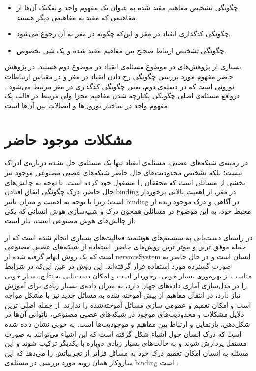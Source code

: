 \documentclass[12pt]{report}
\begin{document}
	\begin{itemize}
		\item چگونگی تشخیص مفاهیم مقید شده به عنوان یک مفهوم واحد  و تفکیک آن‌ها از مفاهیمی که مقید به مفاهیمی دیگر هستند.
		\item چگونگی کد‌گذاری انقیاد در مغز و این‌که چگونه در مغز به آن رجوع می‌شود.
		\item چگونگی تشخیص ارتباط صحیح بین مفاهیم  مقید شده و یک شی بخصوص.
	\end{itemize}

	بسیاری از پژوهش‌های در موضوع مسئله‌ی انقیاد در موضوع دوم هستند. در پژوهش حاضر مفهوم مورد بررسی چگونگی رخ دادن انقیاد در مغز و در مقیاس ارتباطات نورونی است که در دسته‌ی دوم، یعنی چگونگی کدگذاری  در مغز مرتبط می‌شود \cite{Treisman1999}. درواقع مسئله‌ی اصلی چگونگی یکپارچه شدن مفاهیم مجزا ولی مرتبط در قالب یک مفهوم واحد در ساختار نورون‌ها و اتصالات بین آن‌ها است.
	
	
	
	\section{مشکلات موجود حاضر}
	در زمینه‌ی شبکه‌های عصبی، مسئله‌ی انقیاد تنها یک مسئله‌ی حل نشده درباره‌ی ادراک نیست؛ بلکه تشخیص محدودیت‌های حال حاضر شبکه‌های عصبی مصنوعی موجود نیز بخشی از مسائلی است که محققان را مشغول خود کرده است.
	با توجه به چالش‌های حال حاضر، درک چگونگی اتفاق افتادن \gls{binding} در مغز، از اهمیت بالایی برخوردار است؛ زیرا با توجه به اهمیت و میزان تاثیر \gls{binding} در آگاهی و درک موجود زنده از محیط خود، به این موضوع در مسائلی همچون درک و شبیه‌سازی هوش انسانی که یکی از چالش‌های هوش مصنوعی است، نیاز است.
	
	در راستای دست‌یابی به سیستم‌های هوشمند فعالیت‌های بسیاری انجام شده است که از جمله‌ موفق ترین و موثر ترین روش‌های حاضر، استفاده از شبکه‌های عصبی مصنوعی است که یک روش الهام گرفته شده از \gls{nervousSystem} انسان است و در حال حاضر به صورت گسترده مورد استفاده قرار گرفته‌اند. این روش در  عین این‌که در شرایط مناسب از بهره‌وری بسیار خوبی برخوردار است و امکان دست‌یابی به نتایج بسیار خوبی را در مدل‌سازی آماری داده‌های جهان دارد، به میزان داده‌ی بسیار زیادی برای آموزش نیاز دارد، در انتقال مفاهیم از پیش آموخته شده به مسائل جدید نیز با مشکل مواجه است و امکان تعمیم و عمومی سازی مسائل آموخته‌شده را ندارند.
	از جمله اصلی ترین دلایل مشکلات و محدودیت‌های موجود در شبکه‌های عصبی مصنوعی، ناتوانی آن‌ها در شکل‌دهی، بازنمایی و ارتباط بین مفاهیم و موجودیت‌ها است. به خوبی نشان داده شده است که درک انسان حول اشیاء شکل گرفته است که این اشیاء می‌توانند به صورت مستقل پردازش شوند و به حالت‌های بسیار زیادی دوباره با یکدیگر ترکیب شوند و این مسئله به انسان امکان تعمیم درک خود به مسائل فراتر از تجربیاتش را می‌دهد که این ساز‌وکار همان رویه مورد بررسی در مسئله‌ی \gls{binding} است
	\cite{greff2020binding}.
	
\end{document}
